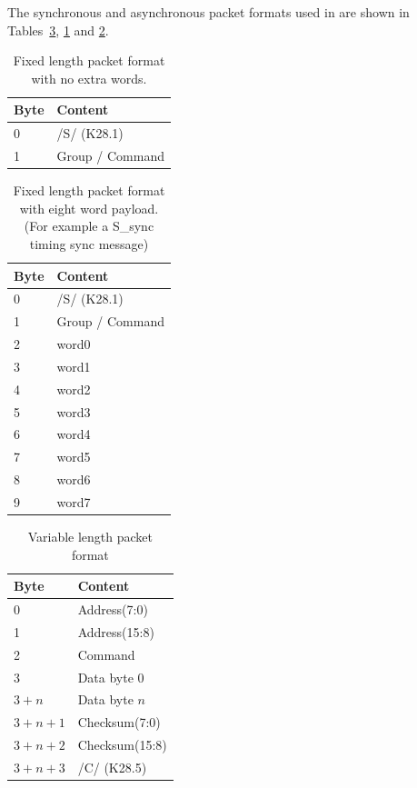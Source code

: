 \documentclass{dune}
\begin{document}
The synchronous and asynchronous packet formats used in  are shown in Tables~\ref{tab:async}, \ref{tab:sync} and \ref{tab:sync-extra-words}.

\begin{table}[h!]
  \centering
  \begin{tabular}{@{}ll@{}} \toprule
    Byte & Content \\ \midrule
    0 & /S/ (K28.1) \\
    1 & Group / Command \\ \bottomrule
  \end{tabular}
  \caption{Fixed length packet format with no extra words.}
  \label{tab:sync}
\end{table}

\begin{table}[h!]
  \centering
  \begin{tabular}{@{}ll@{}} \toprule
    Byte & Content \\ \midrule
    0 & /S/ (K28.1) \\
    1 & Group / Command \\ 
    2 & word0 \\
    3 & word1 \\
    4 & word2 \\
    5 & word3 \\ 
    6 & word4 \\
    7 & word5 \\
    8 & word6 \\
    9 & word7 \\ 
    \bottomrule
  \end{tabular}
  \caption{Fixed length packet format with eight word payload. (For example a S\_sync timing sync message)}
  \label{tab:sync-extra-words}
\end{table}

\begin{table}[h!]
  \centering
  \begin{tabular}{@{}ll@{}} \toprule
    Byte & Content \\ \midrule
    0 & Address(7:0) \\
    1 & Address(15:8) \\
    2 & Command \\
    3 & Data byte 0 \\ 
    $3 + n$ & Data byte $n$ \\ 
    $3 + n + 1$ & Checksum(7:0) \\
    $3 + n + 2$ & Checksum(15:8) \\
    $3 + n + 3$ & /C/ (K28.5) \\ \bottomrule
  \end{tabular}
  \caption{Variable length packet format}
  \label{tab:async}
\end{table}
\end{document}

